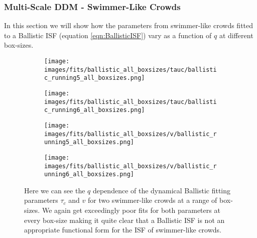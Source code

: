 \documentclass[10pt]{article}
\begin{document}
\subsubsection{Multi-Scale DDM - Swimmer-Like Crowds}
In this section we will show how the parameters from swimmer-like crowds fitted to a Ballistic ISF (equation \ref{eqn:BallisticISF}) vary as a function of $q$ at different box-sizes. 

\begin{figure}[H]
\begin{subfigure}[t]{.5\textwidth}
  \centering
 \texttt{[image: images/fits/ballistic\_all\_boxsizes/tauc/ballistic\_running5\_all\_boxsizes.png]}
  \caption{}
\end{subfigure}%
\hfill
\begin{subfigure}[t]{.5\textwidth}
  \centering
  \texttt{[image: images/fits/ballistic\_all\_boxsizes/tauc/ballistic\_running6\_all\_boxsizes.png]}
  \caption{}
\end{subfigure}
\label{fig:running_ballistic_fits_tauc_all_boxsizes}
\par\bigskip
\begin{subfigure}[t]{.5\textwidth}
  \centering
 \texttt{[image: images/fits/ballistic\_all\_boxsizes/v/ballistic\_running5\_all\_boxsizes.png]}
  \caption{}
\end{subfigure}%
\hfill
\begin{subfigure}[t]{.5\textwidth}
  \centering
  \texttt{[image: images/fits/ballistic\_all\_boxsizes/v/ballistic\_running6\_all\_boxsizes.png]}
  \caption{}
\end{subfigure}
\caption{Here we can see the $q$ dependence of the dynamical Ballistic fitting parameters $\tau_c$ and $v$ for two swimmer-like crowds at a range of box-sizes. We again get exceedingly poor fits for both parameters at every box-size making it quite clear that a Ballistic ISF is not an appropriate functional form for the ISF of swimmer-like crowds.}
\label{fig:running_ballistic_fits_v_all_boxsizes}
\end{figure}
\end{document}
